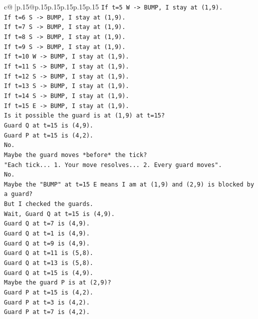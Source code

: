 \documentclass{article}
\begin{document}
{\begin{supertabular}{c@{$\;$}|p{.15\linewidth}@{}p{.15\linewidth}p{.15\linewidth}p{.15\linewidth}p{.15\linewidth}p{.15\linewidth}}
{{{\texttt{If t=5 W {-}> BUMP, I stay at (1,9).} \\
\texttt{If t=6 S {-}> BUMP, I stay at (1,9).} \\
\texttt{If t=7 S {-}> BUMP, I stay at (1,9).} \\
\texttt{If t=8 S {-}> BUMP, I stay at (1,9).} \\
\texttt{If t=9 S {-}> BUMP, I stay at (1,9).} \\
\texttt{If t=10 W {-}> BUMP, I stay at (1,9).} \\
\texttt{If t=11 S {-}> BUMP, I stay at (1,9).} \\
\texttt{If t=12 S {-}> BUMP, I stay at (1,9).} \\
\texttt{If t=13 S {-}> BUMP, I stay at (1,9).} \\
\texttt{If t=14 S {-}> BUMP, I stay at (1,9).} \\
\texttt{If t=15 E {-}> BUMP, I stay at (1,9).} \\
\texttt{Is it possible the guard is at (1,9) at t=15?} \\
\texttt{Guard Q at t=15 is (4,9).} \\
\texttt{Guard P at t=15 is (4,2).} \\
\texttt{No.} \\
\texttt{Maybe the guard moves *before* the tick?} \\
\texttt{"Each tick... 1. Your move resolves... 2. Every guard moves".} \\
\texttt{No.} \\
\texttt{Maybe the "BUMP" at t=15 E means I am at (1,9) and (2,9) is blocked by a guard?} \\
\texttt{But I checked the guards.} \\
\texttt{Wait, Guard Q at t=15 is (4,9).} \\
\texttt{Guard Q at t=7 is (4,9).} \\
\texttt{Guard Q at t=1 is (4,9).} \\
\texttt{Guard Q at t=9 is (4,9).} \\
\texttt{Guard Q at t=11 is (5,8).} \\
\texttt{Guard Q at t=13 is (5,8).} \\
\texttt{Guard Q at t=15 is (4,9).} \\
\texttt{Maybe the guard P is at (2,9)?} \\
\texttt{Guard P at t=15 is (4,2).} \\
\texttt{Guard P at t=3 is (4,2).} \\
\texttt{Guard P at t=7 is (4,2).} \\
}}}
\end{supertabular}}
\end{document}
